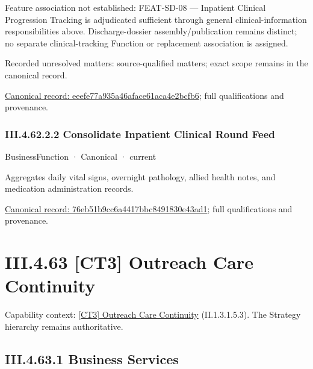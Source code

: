 Feature association not established: FEAT-SD-08 — Inpatient Clinical Progression Tracking is adjudicated sufficient through general clinical-information responsibilities above. Discharge-dossier assembly/publication remains distinct; no separate clinical-tracking Function or replacement association is assigned.


{\small Recorded unresolved matters: source-qualified matters; exact scope remains in the canonical record.}\par
{\footnotesize \href{../../../../continuum/business/business-function/eeefe77a935a46aface61aca4e2bcfb6.md}{Canonical record: eeefe77a935a46aface61aca4e2bcfb6}; full qualifications and provenance.}\par
\subsubsection*{III.4.62.2.2 Consolidate Inpatient Clinical Round Feed}
\label{navigation:III.4.62.2.2}

\label{element:76eb51b9cc6a4417bbc8491830e43ad1}
{\small BusinessFunction · Canonical · current}\par

Aggregates daily vital signs, overnight pathology, allied health notes, and medication administration records.


{\footnotesize \href{../../../../continuum/business/business-function/76eb51b9cc6a4417bbc8491830e43ad1.md}{Canonical record: 76eb51b9cc6a4417bbc8491830e43ad1}; full qualifications and provenance.}\par
\section*{III.4.63 [CT3] Outreach Care Continuity}
\label{navigation:III.4.63}

{\small Capability context: \hyperref[element:8526d971b07f40de84ef05b0d192089c]{[CT3] Outreach Care Continuity} (II.1.3.1.5.3). The Strategy hierarchy remains authoritative.}\par
\subsection*{III.4.63.1 Business Services}
\label{navigation:III.4.63.1}

